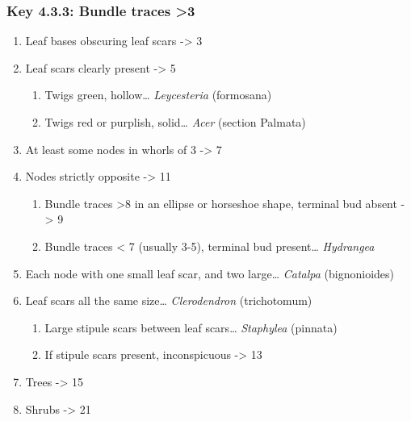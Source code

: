 \documentclass[openany]{book}
\providecommand{\tightlist}{%
  \setlength{\itemsep}{0pt}\setlength{\parskip}{0pt}}
\begin{document}
\hypertarget{key-4.3.3-bundle-traces-3-1}{%
\subsubsection{Key 4.3.3: Bundle traces
\textgreater{}3}\label{key-4.3.3-bundle-traces-3-1}}

\begin{enumerate}
\def\labelenumi{\arabic{enumi}.}
\tightlist
\item
  Leaf bases obscuring leaf scars -\textgreater{} 3
\item
  Leaf scars clearly present -\textgreater{} 5

  \begin{enumerate}
  \def\labelenumii{\arabic{enumii}.}
  \setcounter{enumii}{2}
  \tightlist
  \item
    Twigs green, hollow\ldots{} \emph{Leycesteria} (formosana)
  \item
    Twigs red or purplish, solid\ldots{} \emph{Acer} (section Palmata)
  \end{enumerate}
\item
  At least some nodes in whorls of 3 -\textgreater{} 7
\item
  Nodes strictly opposite -\textgreater{} 11

  \begin{enumerate}
  \def\labelenumii{\arabic{enumii}.}
  \setcounter{enumii}{6}
  \tightlist
  \item
    Bundle traces \textgreater{}8 in an ellipse or horseshoe shape,
    terminal bud absent -\textgreater{} 9
  \item
    Bundle traces \textless{} 7 (usually 3-5), terminal bud
    present\ldots{} \emph{Hydrangea}
  \end{enumerate}
\item
  Each node with one small leaf scar, and two large\ldots{}
  \emph{Catalpa} (bignonioides)
\item
  Leaf scars all the same size\ldots{} \emph{Clerodendron} (trichotomum)

  \begin{enumerate}
  \def\labelenumii{\arabic{enumii}.}
  \setcounter{enumii}{10}
  \tightlist
  \item
    Large stipule scars between leaf scars\ldots{} \emph{Staphylea}
    (pinnata)
  \item
    If stipule scars present, inconspicuous -\textgreater{} 13
  \end{enumerate}
\item
  Trees -\textgreater{} 15
\item
  Shrubs -\textgreater{} 21


\end{enumerate}
\end{document}
